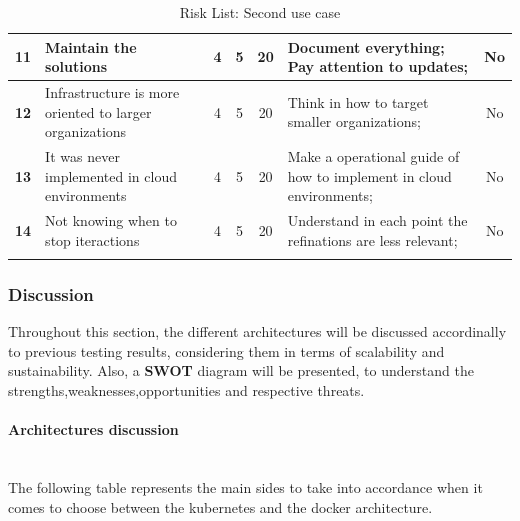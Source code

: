 \begin{longtable}{|c|p{3cm}|c|c|c|p{3cm}|c|}
	\textbf{11} 
	& 
	Maintain the solutions
	& 4 
	& 5 
	& 20
	& Document everything; Pay attention to updates;
	& No
	\\ \hline
	
	\textbf{12} 
	& 
	Infrastructure is more oriented to larger organizations
	& 4 
	& 5 
	& 20 
	& Think in how to target smaller organizations;
	& No
	\\ \hline
	
	\textbf{13} 
	& 
	It was never implemented in cloud environments
	& 4 
	& 5 
	& 20 
	& Make a operational guide of how to implement in cloud environments;
	& No
	\\ \hline
	
	\textbf{14} 
	& 
	Not knowing when to stop iteractions
	& 4 
	& 5 
	& 20 
	& Understand in each point the refinations are less relevant;
	& No
	\\ \hline
	
	\caption{Risk List: Second use case} \label{tab:activity_schedule} 
	
\end{longtable}


\subsubsection{Discussion}

Throughout this section, the different architectures will be
discussed accordinally to previous testing results, considering them in terms of scalability and sustainability. Also, a \textbf{SWOT} diagram will be presented, to understand the strengths,weaknesses,opportunities and respective threats.

\paragraph{Architectures discussion}\mbox{}\\

The following table represents the main sides to take into accordance when it comes to choose between the kubernetes and the docker architecture.


